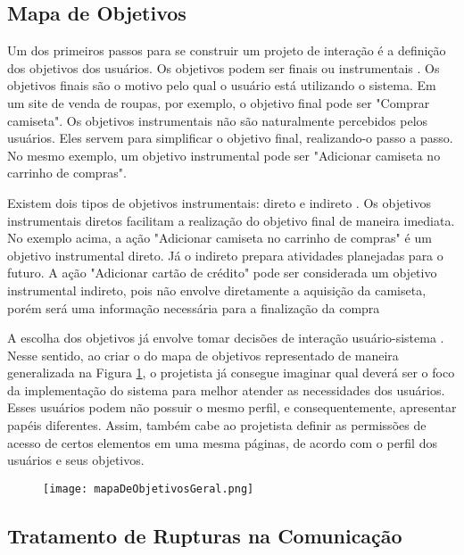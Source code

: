 \subsection{Mapa de Objetivos}

\indent Um dos primeiros passos para se construir um projeto de interação é a definição dos objetivos dos usuários. Os objetivos podem ser finais ou instrumentais \cite{IHCbook}. Os objetivos finais são o motivo pelo qual o usuário está utilizando o sistema. Em um site de venda de roupas, por exemplo, o objetivo final pode ser "Comprar camiseta". Os objetivos instrumentais não são naturalmente percebidos pelos usuários. Eles servem para simplificar o objetivo final, realizando-o passo a passo. No mesmo exemplo, um objetivo instrumental pode ser "Adicionar camiseta no carrinho de compras".

\indent Existem dois tipos de objetivos instrumentais: direto e indireto \cite{IHCbook}. Os objetivos instrumentais diretos facilitam a realização do objetivo final de maneira imediata. No exemplo acima, a ação "Adicionar camiseta no carrinho de compras" é um objetivo instrumental direto. Já o indireto prepara atividades planejadas para o futuro. A ação "Adicionar cartão de crédito" pode ser considerada um objetivo instrumental indireto, pois não envolve diretamente a aquisição da camiseta, porém será uma informação necessária para a finalização da compra

\indent A escolha dos objetivos já envolve tomar decisões de interação usuário-sistema \cite{IHCbook}. Nesse sentido, ao criar o do mapa de objetivos representado de maneira generalizada na Figura \ref{fig:mapaDeObjetivosGeral}, o projetista já consegue imaginar qual deverá ser o foco da implementação do sistema para melhor atender as necessidades dos usuários. Esses usuários podem não possuir o mesmo perfil, e consequentemente, apresentar papéis diferentes. Assim, também cabe ao projetista definir as permissões de acesso de certos elementos em uma mesma páginas, de acordo com o perfil dos usuários e seus objetivos.

\begin{figure}[!h]
    \centering
    \texttt{[image: mapaDeObjetivosGeral.png]}
    \caption{}
    \label{fig:mapaDeObjetivosGeral}
\end{figure} 

\subsection{Tratamento de Rupturas na Comunicação}


